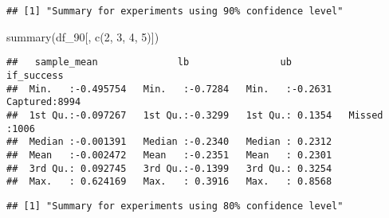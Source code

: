 \documentclass[
]{article}
\newenvironment{Shaded}{\begin{snugshade}}{\end{snugshade}}
\newcommand{\DecValTok}[1]{\textcolor[rgb]{0.00,0.00,0.81}{#1}}
\newcommand{\FunctionTok}[1]{\textcolor[rgb]{0.00,0.00,0.00}{#1}}
\newcommand{\NormalTok}[1]{#1}
\newcommand{\OtherTok}[1]{\textcolor[rgb]{0.56,0.35,0.01}{#1}}
\newcommand{\SpecialCharTok}[1]{\textcolor[rgb]{0.00,0.00,0.00}{#1}}
\newcommand{\StringTok}[1]{\textcolor[rgb]{0.31,0.60,0.02}{#1}}
\begin{document}
\begin{Shaded}
\end{Shaded}

\begin{verbatim}
## [1] "Summary for experiments using 90% confidence level"
\end{verbatim}

\begin{Shaded}
\begin{Highlighting}[]
\FunctionTok{summary}\NormalTok{(df\_90[, }\FunctionTok{c}\NormalTok{(}\DecValTok{2}\NormalTok{, }\DecValTok{3}\NormalTok{, }\DecValTok{4}\NormalTok{, }\DecValTok{5}\NormalTok{)])}
\end{Highlighting}
\end{Shaded}

\begin{verbatim}
##   sample_mean              lb                ub             if_success  
##  Min.   :-0.495754   Min.   :-0.7284   Min.   :-0.2631   Captured:8994  
##  1st Qu.:-0.097267   1st Qu.:-0.3299   1st Qu.: 0.1354   Missed  :1006  
##  Median :-0.001391   Median :-0.2340   Median : 0.2312                  
##  Mean   :-0.002472   Mean   :-0.2351   Mean   : 0.2301                  
##  3rd Qu.: 0.092745   3rd Qu.:-0.1399   3rd Qu.: 0.3254                  
##  Max.   : 0.624169   Max.   : 0.3916   Max.   : 0.8568
\end{verbatim}

\begin{Shaded}
\end{Shaded}

\begin{verbatim}
## [1] "Summary for experiments using 80% confidence level"
\end{verbatim}
\end{document}
